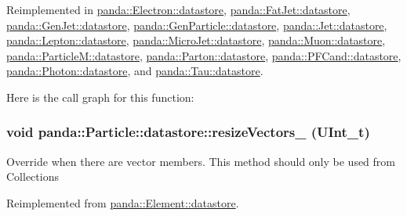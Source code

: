 Reimplemented in \hyperlink{structpanda_1_1Electron_1_1datastore_acd47db6bdd5b2308f4f1b02a9b1bd97f}{panda::Electron::datastore}, \hyperlink{structpanda_1_1FatJet_1_1datastore_a8dd1a45fedb7d5ec627601b23f0dc2d5}{panda::FatJet::datastore}, \hyperlink{structpanda_1_1GenJet_1_1datastore_aea7b516e513fbdf5cc2c6f67d0ae3dba}{panda::GenJet::datastore}, \hyperlink{structpanda_1_1GenParticle_1_1datastore_a7c4f6ca82174720a87fa2371f40000d7}{panda::GenParticle::datastore}, \hyperlink{structpanda_1_1Jet_1_1datastore_ae6ac289071c894912c7a60cdd224509f}{panda::Jet::datastore}, \hyperlink{structpanda_1_1Lepton_1_1datastore_a3288e551dbce7062e6f2e4e88f1a6a40}{panda::Lepton::datastore}, \hyperlink{structpanda_1_1MicroJet_1_1datastore_a9722ed3783e57fb5e55307d72ebddb15}{panda::MicroJet::datastore}, \hyperlink{structpanda_1_1Muon_1_1datastore_ac48b5f3d5fb73f9e54f0f810d11f8010}{panda::Muon::datastore}, \hyperlink{structpanda_1_1ParticleM_1_1datastore_ad6986990fa55f1c6ca4e92db28486922}{panda::ParticleM::datastore}, \hyperlink{structpanda_1_1Parton_1_1datastore_affc6fef2d7648b73182dbb91d5043b36}{panda::Parton::datastore}, \hyperlink{structpanda_1_1PFCand_1_1datastore_a9fc7ec497f046c098b89eb04ee508174}{panda::PFCand::datastore}, \hyperlink{structpanda_1_1Photon_1_1datastore_a05f8dcdf1df8a1e105ca3167c2ab94e2}{panda::Photon::datastore}, and \hyperlink{structpanda_1_1Tau_1_1datastore_ad3b1c3b063d8091225a37315a6dfb998}{panda::Tau::datastore}.

Here is the call graph for this function:\hypertarget{structpanda_1_1Particle_1_1datastore_aef7e06dbd8399f7de3215aa895907c5f}{
\subsubsection[{resizeVectors\_\-}]{\setlength{\rightskip}{0pt plus 5cm}void panda::Particle::datastore::resizeVectors\_\- (UInt\_\-t)}}
\label{structpanda_1_1Particle_1_1datastore_aef7e06dbd8399f7de3215aa895907c5f}


Override when there are vector members. This method should only be used from Collections 

Reimplemented from \hyperlink{structpanda_1_1Element_1_1datastore_a4696a188a70355c43a5482f895433230}{panda::Element::datastore}.

